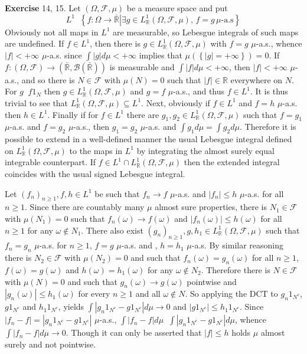 \documentclass[a4paper]{article}
\newcommand{\obj}[1]{\left\{ #1 \right \}}
\newcommand{\brac}[1]{\left ( #1 \right )}
\newcommand{\induc}[1]{\left . #1 \right \vert}
\newcommand{\abs}[1]{\left | #1 \right |}
\newcommand{\Rbar}{{\bar{\mathbb{R}}}}
\newcommand{\Real}{\mathbb{R}}
\newcommand{\Fcal}{\mathcal{F}}
\newcommand{\borel}[1]{\mathcal{B}\brac{#1}}
\newcommand{\defn}{\mathop{\overset{\Delta}{=}}\nolimits}
\begin{document}
\noindent\textbf{Exercise} 14, 15.
Let $\brac{\Omega, \Fcal, \mu}$ be a measure space and put \[L^1 \defn \obj{ \induc{f:\Omega\to \Rbar}  \exists g\in L^1_\Real\brac{\Omega, \Fcal, \mu},\,f=g\,\mu\text{-a.s}}\] Obviously not all maps in $L^1$ are measurable, so Lebesgue integrals of such maps are undefined. If $f\in L^1$, then there is $g\in L^1_\Real\brac{\Omega, \Fcal, \mu}$ with $f=g$ $\mu$-a.s., whence $\abs{f} < +\infty$ $\mu$-a.s. since $\int \abs{g} d\mu < +\infty$ implies that $\mu\brac{\obj{\abs{g} = +\infty}} = 0$. If $f:\brac{\Omega, \Fcal}\to\brac{\Rbar, \borel{\Rbar}}$ is measurable and $\int \abs{f} d\mu < +\infty$, then $\abs{f} < +\infty$ $\mu$-a.s., and so there is $N\in \Fcal$ with $\mu\brac{N} = 0$ such that $\abs{f}\in \Real$ everywhere on $N$. For $g \defn f 1_N$ then $g\in L^1_\Real\brac{\Omega, \Fcal, \mu}$ and $g=f$ $\mu$-a.s., and thus $f\in L^1$. It is thus trivial to see that $L^1_\Real\brac{\Omega, \Fcal, \mu}\subseteq L^1$. Next, obviously if $f\in L^1$ and $f=h$ $\mu$-a.s. then $h\in L^1$. Finally if for $f\in L^1$ there are $g_1, g_2\in L^1_\Real\brac{\Omega, \Fcal, \mu}$ such that $f=g_1$ $\mu$-a.s. and $f=g_2$ $\mu$-a.s., then $g_1 = g_2$ $\mu$-a.s. and $\int g_1 d\mu = \int g_2 d\mu$. Therefore it is possible to extend in a well-defined manner the usual Lebesgue integral defined on $L^1_\Real\brac{\Omega, \Fcal, \mu}$ to the maps in $L^1$ by integrating the almost surely equal integrable counterpart. If $f \in L^1 \cap L^1_\Real\brac{\Omega, \Fcal, \mu}$ then the extended integral coincides with the usual signed Lebesgue integral.

Let $\brac{f_n}_{n\geq 1}, f, h\in L^1$ be such that $f_n\to f$ $\mu$-a.s. and $\abs{f_n}\leq h$ $\mu$-a.s. for all $n\geq 1$. Since there are countably many $\mu$ almost sure properties, there is $N_1\in \Fcal$ with $\mu\brac{N_1}=0$ such that $f_n\brac{\omega}\to f\brac{\omega}$ and $\abs{f_n\brac{\omega}}\leq h\brac{\omega}$ for all $n\geq 1$ for any $\omega\notin N_1$. There also exist $\brac{g_n}_{n\geq 1}, g, h_1 \in L^1_\Real\brac{\Omega, \Fcal, \mu}$ such that $f_n=g_n$ $\mu$-a.s. for $n\geq 1$, $f=g$ $\mu$-a.s. and , $h=h_1$ $\mu$-a.s. By similar reasoning there is $N_2\in \Fcal$ with $\mu\brac{N_2}=0$ and such that $f_n\brac{\omega}=g_n\brac{\omega}$ for all $n\geq 1$, $f\brac{\omega}=g\brac{\omega}$ and $h\brac{\omega}=h_1\brac{\omega}$ for any $\omega\notin N_2$. Therefore there is $N\in \Fcal$ with $\mu\brac{N}=0$ and such that $g_n\brac{\omega}\to g\brac{\omega}$ pointwise and $\abs{g_n\brac{\omega}}\leq h_1\brac{\omega}$ for every $n\geq 1$ and all $\omega\notin N$. So applying the DCT to $g_n 1_{N^c}$, $g 1_{N^c}$ and $h_1 1_{N^c}$, yields $\int \abs{ g_n 1_{N^c} - g 1_{N^c} } d\mu \to 0$ and $\abs{g 1_{N^c}} \leq h_1 1_{N^c}$. Since $\abs{f_n-f} = \abs{g_n 1_{N^c}-g 1_{N^c}}$ $\mu$-a.s., $\int \abs{ f_n - f } d\mu \defn \int \abs{ g_n 1_{N^c} - g 1_{N^c} } d\mu$, whence $\int \abs{ f_n - f } d\mu \to 0$. Though it can only be asserted that $\abs{f}\leq h$ holds $\mu$ almost surely and not pointwise.\\
\end{document}
